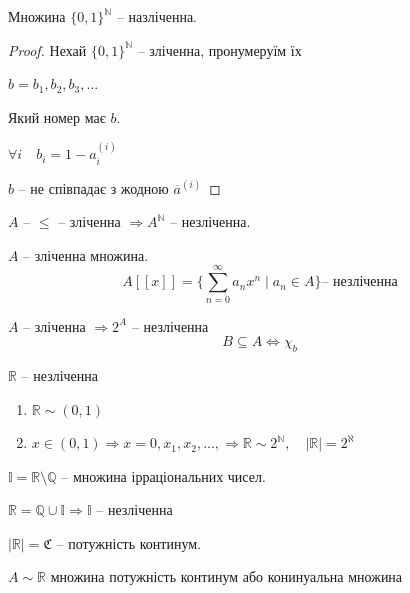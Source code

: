 \begin{theorem}
    Множина $\{0, 1\}^{\mathbb{N}}$ -- назліченна.
\end{theorem}
\begin{proof}
    Нехай $\{0, 1\}^{\mathbb{N}}$ -- зліченна, пронумеруїм їх
    

    $b = b_1, b_2, b_3, ...$
    
    Який номер має $b$.
    
    $\forall i \quad b_i = 1 - a_i^{(i)}$

    $b$ -- не співпадає з жодною $\overline{a}^{(i)}$
\end{proof}

\begin{corollary}
    $A$ -- $\leqslant$ -- зліченна $\Rightarrow A^{\mathbb{N}}$ -- незліченна.
\end{corollary}

\begin{corollary}
    $A$ -- зліченна множина.
    $$A[[x]] = \{ \sum\limits_{n=0}^{\infty} a_n x^n \mid a_n \in A \} \text{-- незліченна}$$
\end{corollary}

\begin{corollary}
    $A$ -- зліченна $\Rightarrow 2^A$ -- незліченна
    $$B \subseteq A \Leftrightarrow \chi_b$$
\end{corollary}

\begin{corollary}
    $\mathbb{R}$ -- незліченна
    
    

    \begin{enumerate}
        \item $\mathbb{R} \sim (0, 1)$
        \item $x \in (0, 1) \Rightarrow x = 0, x_1, x_2, ..., \Rightarrow \mathbb{R} \sim 2^{\mathbb{N}}, \quad |\mathbb{R}| = 2^{\aleph}$
    \end{enumerate}
\end{corollary}

\begin{corollary}
    $\mathbb{I} = \mathbb{R} \setminus \mathbb{Q}$ -- множина ірраціональних чисел.

    $\mathbb{R} = \mathbb{Q} \cup \mathbb{I} \Rightarrow \mathbb{I} \text{ -- незліченна}$

    $|\mathbb{R}| = \mathfrak{C} \text{ -- потужність континум}.$

    $A \sim \mathbb{R}$ множина потужність континум або конинуальна множина
\end{corollary}

